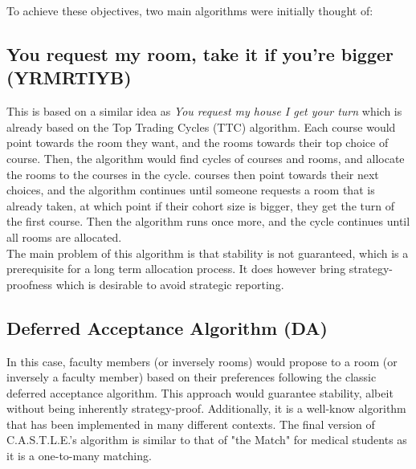 \documentclass[a4paper, oneside]{article}
\theoremstyle{plain}
\newcommand{\castle}{C{\small.}A{\small.}S{\small.}T{\small.}L{\small.}E{\small.}}
\begin{document}
To achieve these objectives, two main algorithms were initially thought of:

\subsection*{You request my room, take it if you're bigger (YRMRTIYB)}
This is based on a similar idea as \textit{You request my house I get your turn} which is already based on the Top Trading Cycles (TTC) algorithm.
Each course would point towards the room they want, and the rooms towards their top choice of course. Then, the algorithm would find cycles of courses and rooms, and allocate the rooms to the courses in the cycle.
courses then point towards their next choices, and the algorithm continues until someone requests a room that is already taken, at which point if their cohort size is bigger, they get the turn of the first course.
Then the algorithm runs once more, and the cycle continues until all rooms are allocated.\\

The main problem of this algorithm is that stability is not guaranteed, which is a prerequisite for a long term allocation process. It does however bring strategy-proofness which is desirable to
avoid strategic reporting.

\subsection*{Deferred Acceptance Algorithm (DA)}
In this case, faculty members (or inversely rooms) would propose to a room (or inversely a faculty member) based on their preferences following the classic deferred acceptance algorithm.
This approach would guarantee stability, albeit without being inherently strategy-proof. Additionally, it is a well-know algorithm that has been implemented in many different contexts.
The final version of \castle{}'s algorithm is similar to that of "the Match" for medical students as it is a one-to-many matching.
\end{document}
